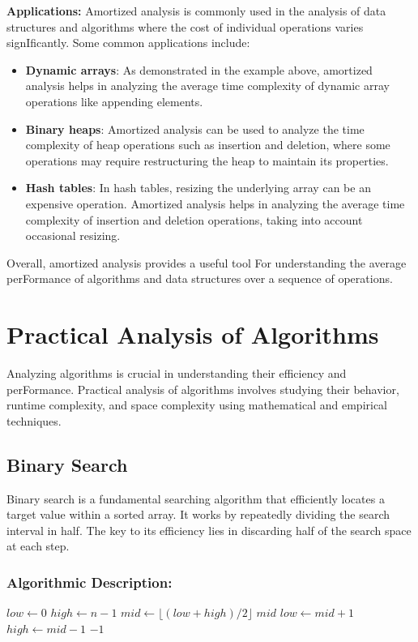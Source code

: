 \documentclass[12pt]{book} %
\begin{document}
\FloatBarrier
\textbf{Applications:}
\FloatBarrier
Amortized analysis is commonly used in the analysis of data structures and algorithms where the cost of individual operations varies signIficantly. Some common applications include:

\begin{itemize}
    \item \textbf{Dynamic arrays}: As demonstrated in the example above, amortized analysis helps in analyzing the average time complexity of dynamic array operations like appending elements.
    
    \item \textbf{Binary heaps}: Amortized analysis can be used to analyze the time complexity of heap operations such as insertion and deletion, where some operations may require restructuring the heap to maintain its properties.
    
    \item \textbf{Hash tables}: In hash tables, resizing the underlying array can be an expensive operation. Amortized analysis helps in analyzing the average time complexity of insertion and deletion operations, taking into account occasional resizing.
\end{itemize}

Overall, amortized analysis provides a useful tool For understanding the average perFormance of algorithms and data structures over a sequence of operations.

\section{Practical Analysis of Algorithms}
Analyzing algorithms is crucial in understanding their efficiency and perFormance. Practical analysis of algorithms involves studying their behavior, runtime complexity, and space complexity using mathematical and empirical techniques.
\subsection{Binary Search}
Binary search is a fundamental searching algorithm that efficiently locates a target value within a sorted array. It works by repeatedly dividing the search interval in half. The key to its efficiency lies in discarding half of the search space at each step.
\subsubsection{Algorithmic Description:}
\begin{algorithm}
\caption{Binary Search}
\begin{algorithmic}[1]
\State $low \gets 0$
\State $high \gets n - 1$
    \State $mid \gets \lfloor(low + high) / 2 \rfloor$
        \State \Return $mid$
        \State $low \gets mid + 1$
    \Else
        \State $high \gets mid - 1$
    \EndIf
\EndWhile
\State \Return $-1$ 
\EndFunction
\end{algorithmic}
\end{algorithm}
\end{document}
